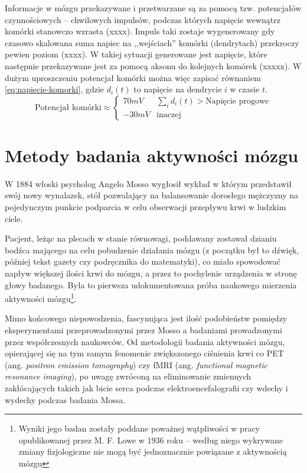 \documentclass{./assets/wfis}
\begin{document}
Informacje w mózgu przekazywane i przetwarzane są za pomocą tzw. potencjałów czynnościowych – chwilowych impulsów, podczas których napięcie wewnątrz komórki stanowczo wzrasta (xxxx). Impuls taki zostaje wygenerowany gdy czasowo skalowana suma napiec na ,,wejściach'' komórki (dendrytach) przekroczy pewien poziom (xxxx). W takiej sytuacji generowane jest napięcie, które następnie przekazywane jest za pomocą aksonu do kolejnych komórek (xxxxx). W dużym uproszczeniu potencjał komórki można więc zapisać równaniem \ref{eq:napiecie-komorki}, gdzie $d_i(t)$ to napięcie na dendrycie $i$ w czasie $t$.
\begin{equation}\label{eq:napiecie-komorki}
    \text{Potencjał komórki} \approx 
    \begin{cases} 
      70mV & \sum_i d_i(t) > \text{Napięcie progowe}  \\
      -30mV &  \text{inaczej}
   \end{cases}
\end{equation}


\section{Metody badania aktywności mózgu}
W 1884 włoski psycholog Angelo Mosso wygłosił wykład \cite{sandrone_weighing_2014} w którym przedstawił swój nowy wynalazek, stół pozwalający na balansowanie dorosłego mężczyzny na pojedynczym punkcie podparcia w celu obserwacji przepływu krwi w ludzkim ciele. 

Pacjent, leżąc na plecach w stanie równowagi, poddawany zostawał dzianiu bodźca mającego na celu pobudzenie działania mózgu (z początku był to dźwięk, później tekst gazety czy podręcznika do matematyki\cite{sandrone_weighing_2014}), co miało spowodować napływ większej ilości krwi do mózgu, a przez to pochylenie urządzenia w stronę głowy badanego. Była to pierwsza udokumentowana próba naukowego mierzenia aktywności mózgu\footnote{Wyniki jego badan zostały poddane poważnej wątpliwości w pracy opublikowanej przez M. F. Lowe \cite{lowe_application_1936} w 1936 roku – według niego wykrywane zmiany fizjologiczne nie mogą być jednoznacznie powiązane z aktywnością mózgu}.

Mimo końcowego niepowodzenia, fascynująca jest ilość podobieństw pomiędzy eksperymentami przeprowadzonymi przez Mosso a badaniami prowadzonymi przez współczesnych naukowców. Od metodologii badania aktywności mózgu, opierającej się na tym samym fenomenie zwiększonego ciśnienia krwi co PET (ang. \textit{positron emission tomography}) czy fMRI (ang. \textit{functional magnetic resonance imaging}), po uwagę zwróconą na eliminowanie zmiennych zakłócających takich jak bicie serca podczas elektroencefalografii czy wdechy i wydechy podczas badania Mossa.
\end{document}
